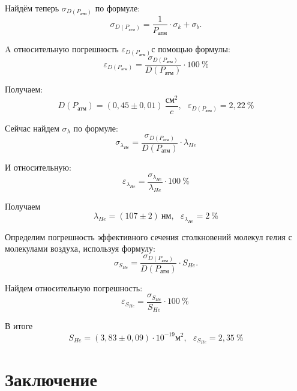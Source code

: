 Найдём теперь $\sigma_{D(P_{\text{атм}})}$ по формуле:
\begin{equation}
	\sigma_{D(P_{\text{атм}})} = \dfrac{1}{P_{\text{атм}}} \cdot \sigma_k + \sigma_b.
\end{equation}

A относительную погрешность $\varepsilon_{D(P_{\text{атм}})}$с помощью формулы:
\begin{equation}
	\varepsilon_{D(P_{\text{атм}})} = \dfrac{\sigma_{D(P_{\text{атм}})}}{D(P_{\text{атм}})}\cdot 100\ \%
\end{equation}

Получаем:
\begin{equation}
	D(P_{\text{атм}}) = (0,45 \pm 0,01)\ \frac{\text{см}^2}{c}, \ ~ \ \varepsilon_{D(P_{\text{атм}})} = 2,22\ \%
\end{equation}

Сейчас найдем $\sigma_{\lambda}$ по формуле:
\begin{equation}
	\sigma_{\lambda_{He}} = \dfrac{\sigma_{D(P_{\text{атм}})}}{D(P_{\text{атм}})} \cdot \lambda_{He}
\end{equation}

И относительную:
\begin{equation}
	\varepsilon_{\lambda_{He}} = \dfrac{\sigma_{\lambda_{He}}}{\lambda_{He}}\cdot 100\ \%
\end{equation}

Получаем
\begin{equation}
	\lambda_{He} = (107 \pm 2)\ \text{нм}, \ ~ \ \varepsilon_{\lambda_{He}} = 2\ \%
\end{equation}


Определим погрешность эффективного сечения столкновений молекул гелия с молекулами воздуха, используя формулу:  
\begin{equation}
	\sigma_{S_{He}} = \dfrac{\sigma_{D(P_{\text{атм}})}}{D(P_{\text{атм}})} \cdot S_{He}.
\end{equation}

Найдем относительную погрешность:
\begin{equation}
	\varepsilon_{S_{He}} = \dfrac{\sigma_{S_{He}}}{S_{He}}\cdot 100\ \%\ 
\end{equation}

В итоге
\begin{equation}
	S_{He} = (3,83 \pm 0,09) \cdot 10^{-19} \text{м}^2,\ ~ \  \varepsilon_{S_{He}} = 2,35\ \%
\end{equation}
\newpage

\section{Заключение}


